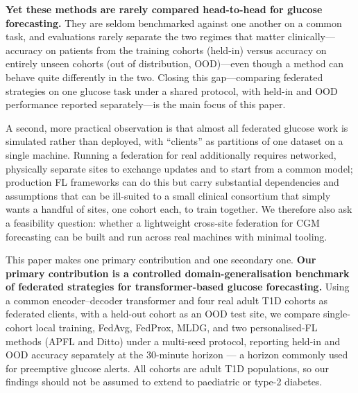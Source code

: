 \documentclass[10pt,letterpaper]{article}
\begin{document}
\textbf{Yet these methods are rarely compared head-to-head for glucose
forecasting.} They are seldom benchmarked against one another on a common task, and
evaluations rarely separate the two regimes that matter clinically---accuracy on
patients from the training cohorts (held-in) versus accuracy on entirely unseen
cohorts (out of distribution, OOD)---even though a method can behave quite
differently in the two. Closing this gap---comparing federated strategies on one
glucose task under a shared protocol, with held-in and OOD performance reported
separately---is the main focus of this paper.

A second, more practical observation is that almost all federated glucose work is
simulated rather than deployed, with ``clients'' as partitions of one dataset on a
single machine. Running a federation for real additionally requires networked,
physically separate sites to exchange updates and to start from a common model;
production FL frameworks can do this but carry substantial dependencies and
assumptions that can be ill-suited to a small clinical consortium that simply wants
a handful of sites, one cohort each, to train together. We therefore also ask a
feasibility question: whether a lightweight cross-site federation for CGM
forecasting can be built and run across real machines with minimal tooling.

This paper makes one primary contribution and one secondary one. \textbf{Our
primary contribution is a controlled domain-generalisation benchmark of federated
strategies for transformer-based glucose forecasting.} Using a common
encoder--decoder transformer and four real adult T1D cohorts as federated
clients, with a held-out cohort as an OOD test site, we compare single-cohort
local training, FedAvg, FedProx, MLDG, and two personalised-FL methods (APFL and
Ditto) under a multi-seed protocol, reporting held-in and OOD accuracy separately
at the 30-minute horizon --- a horizon commonly used for preemptive glucose
alerts. All cohorts are adult T1D populations, so our findings should not be
assumed to extend to paediatric or type-2 diabetes.
\end{document}
